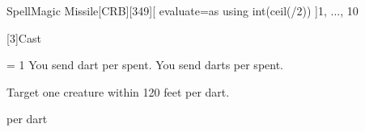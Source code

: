 
\begin{card-collection}{Spell}{\level}{Magic Missile}[CRB][349]{\level}[
  evaluate=\level as \half using int(ceil(\level/2))
]{1, ..., 10}



[3]{Cast}

\ifnum \half = 1
You send \half{} dart per  spent.
\else
You send \half{} darts per  spent.
\fi

Target one creature within 120 feet per dart.

 per dart
\end{card-collection}